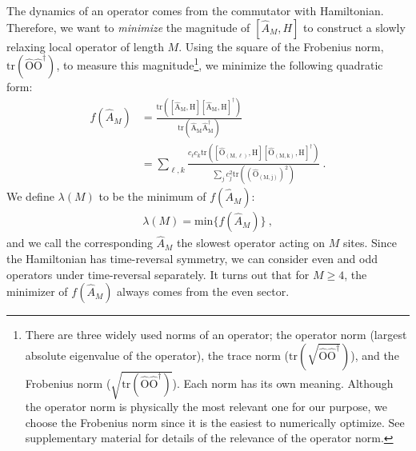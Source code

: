\documentclass[twocolumn,superscriptaddress, prl,showpacs]{revtex4-1}
\begin{document}
The dynamics of an operator comes from the commutator with Hamiltonian.
Therefore, we want to {\it minimize} the magnitude of $[\hat{A}_M, H]$
to construct a slowly relaxing local operator of length $M$.
Using the square of the Frobenius norm, $\mathrm{tr(\hat{O}\hat{O}^\dag)}$, to measure this magnitude\footnote{There are three widely used norms of an operator;
the operator norm (largest absolute eigenvalue of the operator), the trace norm ($\mathrm{tr(\sqrt{\hat{O}\hat{O}^\dag})}$),
and the Frobenius norm ($\sqrt{\mathrm{tr(\hat{O}\hat{O}^\dag)}}$). Each norm has its own meaning.
Although the operator norm is physically the most relevant one for our purpose,
we choose the Frobenius norm since it is the easiest to numerically optimize.
See supplementary material for details of the relevance of the operator norm.},
we minimize the following quadratic form:
\begin{align}\label{eq:minimize}
f(\hat{A}_M) &= \frac{\mathrm{tr([\hat{A}_M,H][\hat{A}_M,H]^\dag)}}{\mathrm{tr(\hat{A}_M\hat{A}^\dag_M)}} \nonumber\\
&= \sum_{\ell,k}\frac{c_\ell c_k \mathrm{tr([\hat{O}_{(M,\ell)},H][\hat{O}_{(M,k)},H]^\dag)}}{\sum_j c_j ^2 \mathrm{tr((\hat{O}_{(M,j)})^2)}} ~.
\end{align}
We define $\lambda(M)$ to be the minimum of $f(\hat{A}_M)$:
\begin{align}
\lambda(M) = \mathrm{min}\{f(\hat{A}_M)\} ~,
\end{align}
and we call the corresponding $\hat{A}_M$ the slowest operator acting on $M$ sites.
Since the Hamiltonian has time-reversal symmetry,
we can consider even and odd operators under time-reversal separately.
It turns out that for $M\geq 4$, the minimizer of $f(\hat{A}_M)$ always comes from the even sector.
\end{document}
